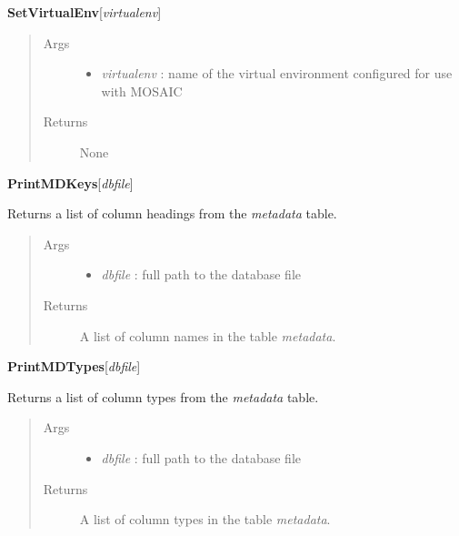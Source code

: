 \documentclass[letterpaper,10pt,english]{sphinxmanual}
\begin{document}
\textbf{SetVirtualEnv}{[}\emph{virtualenv}{]}
\begin{quote}\begin{description}
\item[{Args}] \leavevmode\begin{itemize}
\item {} 
\emph{virtualenv} :        name of the virtual environment configured for use with MOSAIC

\end{itemize}

\item[{Returns}] \leavevmode
None

\end{description}\end{quote}

\textbf{PrintMDKeys}{[}\emph{dbfile}{]}

Returns a list of column headings from the \emph{metadata} table.
\begin{quote}\begin{description}
\item[{Args}] \leavevmode\begin{itemize}
\item {} 
\emph{dbfile} :    full path to the database file

\end{itemize}

\item[{Returns}] \leavevmode
A list of column names in the table \emph{metadata}.

\end{description}\end{quote}

\textbf{PrintMDTypes}{[}\emph{dbfile}{]}

Returns a list of column types from the \emph{metadata} table.
\begin{quote}\begin{description}
\item[{Args}] \leavevmode\begin{itemize}
\item {} 
\emph{dbfile} :    full path to the database file

\end{itemize}

\item[{Returns}] \leavevmode
A list of column types in the table \emph{metadata}.

\end{description}\end{quote}
\end{document}

